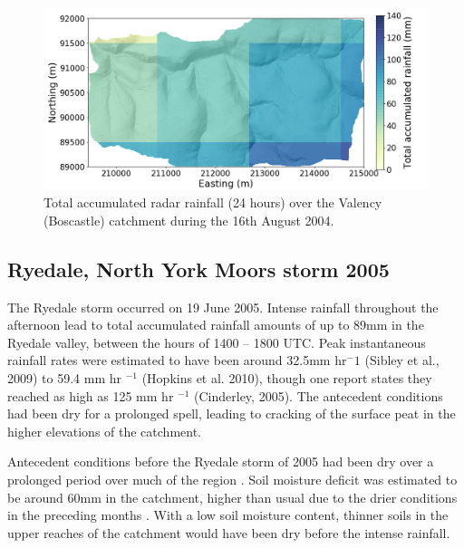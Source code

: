 
\begin{figure}[htb]
\includegraphics[width=15cm]{chp_events_figures_scripts/figure_boscastle_total_rainfall.png}
\caption{Total accumulated radar rainfall (24 hours) over the Valency (Boscastle) catchment during the 16th August 2004.}
\label{fig_boscastle_rain_totals}
\end{figure}


\subsection{Ryedale, North York Moors storm 2005}
The Ryedale storm occurred on 19 June 2005. Intense rainfall throughout the afternoon lead to total accumulated rainfall amounts of up to 89mm in the Ryedale valley, between the hours of 1400 -- 1800 UTC. Peak instantaneous rainfall rates were estimated to have been around 32.5mm hr\(^-1\) (Sibley et al., 2009) to 59.4 mm hr \(^{-1}\) (Hopkins et al. 2010), though one report states they reached as high as 125 mm hr \(^{-1}\) (Cinderley, 2005). The antecedent conditions had been dry for a prolonged spell, leading to cracking of the surface peat in the higher elevations of the catchment.

Antecedent conditions before the Ryedale storm of 2005 had been dry over a prolonged period over much of the region \citep{sibley2009analysis}. Soil moisture deficit was estimated to be around 60mm in the catchment, higher than usual due to the drier conditions in the preceding months \citep{wass2008investigation}. With a low soil moisture content, thinner soils in the upper reaches of the catchment would have been dry before the intense rainfall.

